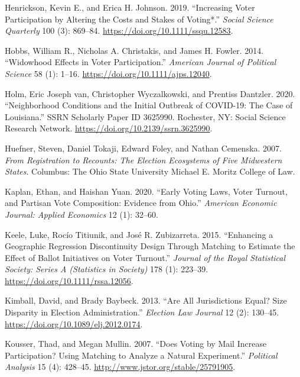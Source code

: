 \documentclass[
  12pt,
]{article}
\newlength{\cslhangindent}
\newenvironment{cslreferences}%
  {\setlength{\parindent}{0pt}%
  \everypar{\setlength{\hangindent}{\cslhangindent}}\ignorespaces}%
  {\par}
\begin{document}
\begin{cslreferences}
\leavevmode\hypertarget{ref-Henrickson2019}{}%
Henrickson, Kevin E., and Erica H. Johnson. 2019. ``Increasing Voter Participation by Altering the Costs and Stakes of Voting*.'' \emph{Social Science Quarterly} 100 (3): 869--84. \url{https://doi.org/10.1111/ssqu.12583}.

\leavevmode\hypertarget{ref-Hobbs2014}{}%
Hobbs, William R., Nicholas A. Christakis, and James H. Fowler. 2014. ``Widowhood Effects in Voter Participation.'' \emph{American Journal of Political Science} 58 (1): 1--16. \url{https://doi.org/10.1111/ajps.12040}.

\leavevmode\hypertarget{ref-vanHolm2020}{}%
Holm, Eric Joseph van, Christopher Wyczalkowski, and Prentiss Dantzler. 2020. ``Neighborhood Conditions and the Initial Outbreak of COVID-19: The Case of Louisiana.'' SSRN Scholarly Paper ID 3625990. Rochester, NY: Social Science Research Network. \url{https://doi.org/10.2139/ssrn.3625990}.

\leavevmode\hypertarget{ref-Huefner2007}{}%
Huefner, Steven, Daniel Tokaji, Edward Foley, and Nathan Cemenska. 2007. \emph{From Registration to Recounts: The Election Ecosystems of Five Midwestern States}. Columbus: The Ohio State University Michael E. Moritz College of Law.

\leavevmode\hypertarget{ref-Kaplan2020}{}%
Kaplan, Ethan, and Haishan Yuan. 2020. ``Early Voting Laws, Voter Turnout, and Partisan Vote Composition: Evidence from Ohio.'' \emph{American Economic Journal: Applied Economics} 12 (1): 32--60.

\leavevmode\hypertarget{ref-Keele2015}{}%
Keele, Luke, Rocío Titiunik, and José R. Zubizarreta. 2015. ``Enhancing a Geographic Regression Discontinuity Design Through Matching to Estimate the Effect of Ballot Initiatives on Voter Turnout.'' \emph{Journal of the Royal Statistical Society: Series A (Statistics in Society)} 178 (1): 223--39. \url{https://doi.org/10.1111/rssa.12056}.

\leavevmode\hypertarget{ref-Kimball2013}{}%
Kimball, David, and Brady Baybeck. 2013. ``Are All Jurisdictions Equal? Size Disparity in Election Administration.'' \emph{Election Law Journal} 12 (2): 130--45. \url{https://doi.org/10.1089/elj.2012.0174}.

\leavevmode\hypertarget{ref-Kousser2007}{}%
Kousser, Thad, and Megan Mullin. 2007. ``Does Voting by Mail Increase Participation? Using Matching to Analyze a Natural Experiment.'' \emph{Political Analysis} 15 (4): 428--45. \url{http://www.jstor.org/stable/25791905}.


\end{cslreferences}
\end{document}
